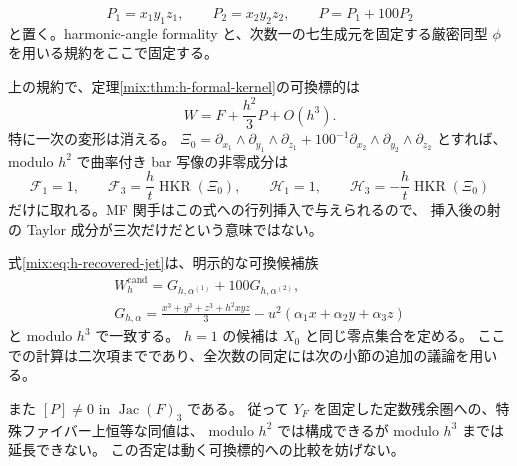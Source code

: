 \[
 P_1=x_1y_1z_1,\qquad P_2=x_2y_2z_2,\qquad P=P_1+100P_2
\]
と置く。harmonic-angle formality と、次数一の七生成元を固定する厳密同型
$\phi$ を用いる規約をここで固定する。

\begin{proposition}[実関手の一次成分と候補式に一致する二次項]
\label{mix:prop:h-kernel-jet}
上の規約で、定理\ref{mix:thm:h-formal-kernel}の可換標的は
\begin{equation}\label{mix:eq:h-recovered-jet}
 W=F+\frac{h^2}{3}P+O(h^3).
\end{equation}
特に一次の変形は消える。
$\Xi_0=\partial_{x_1}\wedge\partial_{y_1}\wedge\partial_{z_1}
+100^{-1}\partial_{x_2}\wedge\partial_{y_2}\wedge\partial_{z_2}$ とすれば、
modulo $h^2$ で曲率付き bar 写像の非零成分は
\begin{equation}\label{mix:eq:h-first-functor}
 \mathcal F_1=1,\qquad
 \mathcal F_3=\frac h t\operatorname{HKR}(\Xi_0),\qquad
 \mathcal H_1=1,\qquad
 \mathcal H_3=-\frac h t\operatorname{HKR}(\Xi_0)
\end{equation}
だけに取れる。MF 関手はこの式への行列挿入で与えられるので、
挿入後の射の Taylor 成分が三次だけだという意味ではない。

式\eqref{mix:eq:h-recovered-jet}は、明示的な可換候補族
\begin{equation}\label{mix:eq:h-commutative-candidate}
 \begin{gathered}
 W_h^{\mathrm{cand}}=G_{h,\alpha^{(1)}}+100G_{h,\alpha^{(2)}},\\
 G_{h,\alpha}
 =\frac{x^3+y^3+z^3+h^2xyz}{3}
       -u^2(\alpha_1x+\alpha_2y+\alpha_3z)
 \end{gathered}
\end{equation}
と modulo $h^3$ で一致する。
$h=1$ の候補は $X_0$ と同じ零点集合を定める。
ここでの計算は二次項までであり、全次数の同定には次の小節の追加の議論を用いる。

また $[P]\ne0$ in $\operatorname{Jac}(F)_3$ である。
従って $Y_F$ を固定した定数残余圏への、特殊ファイバー上恒等な同値は、
modulo $h^2$ では構成できるが modulo $h^3$ までは延長できない。
この否定は動く可換標的への比較を妨げない。
\end{proposition}

